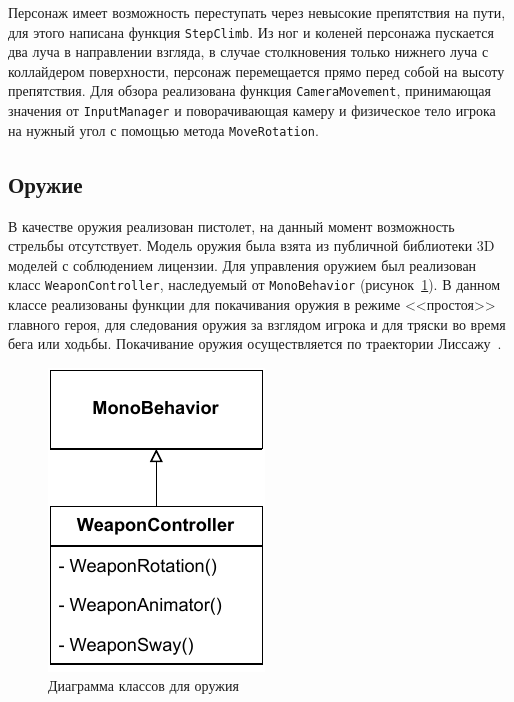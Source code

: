 Персонаж имеет возможность переступать через невысокие препятствия на пути, для этого написана функция \texttt{StepClimb}. Из ног и коленей персонажа пускается два луча в направлении взгляда, в случае столкновения только нижнего луча с коллайдером поверхности, персонаж перемещается прямо перед собой на высоту препятствия.
Для обзора реализована функция \texttt{CameraMovement}, принимающая значения от \texttt{InputManager} и поворачивающая камеру и физическое тело игрока на нужный угол с помощью метода \texttt{MoveRotation}.

\subsection{Оружие}
В качестве оружия реализован пистолет, на данный момент возможность стрельбы отсутствует. Модель оружия была взята из публичной библиотеки 3D моделей с соблюдением лицензии. Для управления оружием был реализован класс \texttt{WeaponController}, наследуемый от \texttt{MonoBehavior} (рисунок~\ref{fig:Weapon}). В данном классе реализованы функции для покачивания оружия в режиме <<простоя>> главного героя, для следования оружия за взглядом игрока и для тряски во время бега или ходьбы. Покачивание оружия осуществляется по траектории Лиссажу~\cite{enwiki:1187167880}.

\begin{figure}[H]
    \centering
    \includegraphics[width=7 cm]{figures/WeaponController.pdf}
    \caption{Диаграмма классов для оружия}
    \label{fig:Weapon}
\end{figure}

